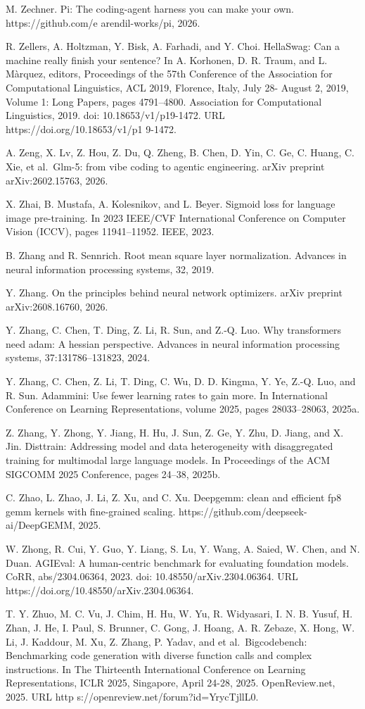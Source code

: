 M. Zechner. Pi: The coding-agent harness you can make your own.
https://github.com/e arendil-works/pi, 2026.

R. Zellers, A. Holtzman, Y. Bisk, A. Farhadi, and Y. Choi. HellaSwag:
Can a machine really finish your sentence? In A. Korhonen, D. R. Traum,
and L. Màrquez, editors, Proceedings of the 57th Conference of the
Association for Computational Linguistics, ACL 2019, Florence, Italy,
July 28- August 2, 2019, Volume 1: Long Papers, pages 4791--4800.
Association for Computational Linguistics, 2019. doi:
10.18653/v1/p19-1472. URL https://doi.org/10.18653/v1/p1 9-1472.

A. Zeng, X. Lv, Z. Hou, Z. Du, Q. Zheng, B. Chen, D. Yin, C. Ge, C.
Huang, C. Xie, et al.~Glm-5: from vibe coding to agentic engineering.
arXiv preprint arXiv:2602.15763, 2026.

X. Zhai, B. Mustafa, A. Kolesnikov, and L. Beyer. Sigmoid loss for
language image pre-training. In 2023 IEEE/CVF International Conference
on Computer Vision (ICCV), pages 11941--11952. IEEE, 2023.

B. Zhang and R. Sennrich. Root mean square layer normalization. Advances
in neural information processing systems, 32, 2019.

Y. Zhang. On the principles behind neural network optimizers. arXiv
preprint arXiv:2608.16760, 2026.

Y. Zhang, C. Chen, T. Ding, Z. Li, R. Sun, and Z.-Q. Luo. Why
transformers need adam: A hessian perspective. Advances in neural
information processing systems, 37:131786--131823, 2024.

Y. Zhang, C. Chen, Z. Li, T. Ding, C. Wu, D. D. Kingma, Y. Ye, Z.-Q.
Luo, and R. Sun. Adammini: Use fewer learning rates to gain more. In
International Conference on Learning Representations, volume 2025, pages
28033--28063, 2025a.



Z. Zhang, Y. Zhong, Y. Jiang, H. Hu, J. Sun, Z. Ge, Y. Zhu, D. Jiang,
and X. Jin. Disttrain: Addressing model and data heterogeneity with
disaggregated training for multimodal large language models. In
Proceedings of the ACM SIGCOMM 2025 Conference, pages 24--38, 2025b.

C. Zhao, L. Zhao, J. Li, Z. Xu, and C. Xu. Deepgemm: clean and efficient
fp8 gemm kernels with fine-grained scaling.
https://github.com/deepseek-ai/DeepGEMM, 2025.

W. Zhong, R. Cui, Y. Guo, Y. Liang, S. Lu, Y. Wang, A. Saied, W. Chen,
and N. Duan. AGIEval: A human-centric benchmark for evaluating
foundation models. CoRR, abs/2304.06364, 2023. doi:
10.48550/arXiv.2304.06364. URL
https://doi.org/10.48550/arXiv.2304.06364.

T. Y. Zhuo, M. C. Vu, J. Chim, H. Hu, W. Yu, R. Widyasari, I. N. B.
Yusuf, H. Zhan, J. He, I. Paul, S. Brunner, C. Gong, J. Hoang, A. R.
Zebaze, X. Hong, W. Li, J. Kaddour, M. Xu, Z. Zhang, P. Yadav, and et
al.~Bigcodebench: Benchmarking code generation with diverse function
calls and complex instructions. In The Thirteenth International
Conference on Learning Representations, ICLR 2025, Singapore, April
24-28, 2025. OpenReview.net, 2025. URL http
s://openreview.net/forum?id=YrycTjllL0.
